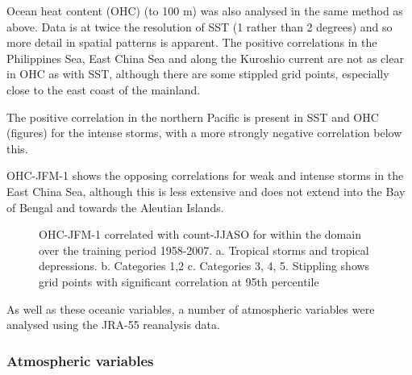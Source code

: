 Ocean heat content (OHC) (to 100 m) was also analysed in the same method as above. Data is at twice the resolution of SST (1 rather than 2 degrees) and so more detail in spatial patterns is apparent. 
The positive correlations in the Philippines Sea, East China Sea and along the Kuroshio current are not as clear in OHC as with SST, although there are some stippled grid points, especially close to the east coast of the mainland.


The positive correlation in the northern Pacific is present in SST and OHC (figures) for the intense storms, with a more strongly negative correlation below this.

OHC-JFM-1 shows the opposing correlations for weak and intense storms in the East China Sea, although this is less extensive and does not extend into the Bay of Bengal and towards the Aleutian Islands.

\begin{figure}
	\centering


	\caption{OHC-JFM-1 correlated with count-JJASO for within the domain over the training period 1958-2007. a. Tropical storms and tropical depressions. b. Categories 1,2 c. Categories 3, 4, 5. Stippling shows grid points with significant correlation at 95th percentile} \label{fig:ohc_prevJFM} 
\end{figure} 

As well as these oceanic variables, a number of atmospheric variables were analysed using the JRA-55 reanalysis data.

\subsubsection{Atmospheric variables}

